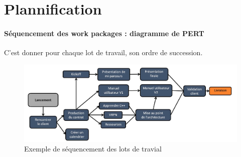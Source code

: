 \section{Plannification}
\paragraph*{Séquencement des work packages : diagramme de PERT}
C'est donner pour chaque lot de travail, son ordre de succession.
\begin{figure}[!h]
	\begin{center}
		\includegraphics[scale=0.2]{images/exemple_sequencement_lots.png}
		\caption{Exemple de séquencement des lots de travial}
	\end{center}
\end{figure}
